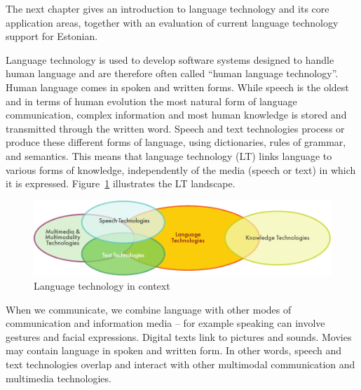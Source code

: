 \begin{multicols}{2}
The next chapter gives an introduction to language technology and its core application areas, together with an evaluation of current language technology support for Estonian.

\end{multicols}

\clearpage


\begin{multicols}{2}

Language technology is used to develop software systems designed to handle human language and are therefore often called ``human language technology''. Human language comes in spoken and written forms. While speech is the oldest and in terms of human evolution the most natural form of language communication, complex information and most human knowledge is stored and transmitted through the written word. Speech and text technologies process or produce these different forms of language, using dictionaries, rules of grammar, and semantics. This means that language technology (LT) links language to various forms of knowledge, independently of the media (speech or text) in which it is expressed. Figure~\ref{fig:ltincontext_en} illustrates the LT landscape.

\begin{figure}[htb]
  \center
  \includegraphics[width=\textwidth]{../_media/english/language_technologies}
  \caption{Language technology in context}
\label{fig:ltincontext_en}
\end{figure}

When we communicate, we combine language with other modes of communication and information media -- for example speaking can involve gestures and facial expressions. Digital texts link to pictures and sounds. Movies may contain language in spoken and written form. In other words, speech and text technologies overlap and interact with other multimodal communication and multimedia technologies.


\end{multicols}
